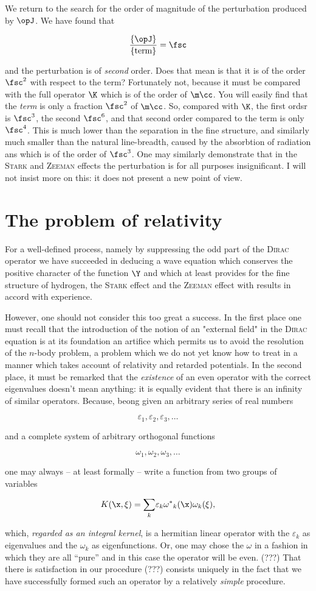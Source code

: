 \documentclass{article}
\newcommand{\uequ}[1]{
\begin{equation*}
#1
\end{equation*}
}
\newcommand{\var}[1]{#1}
\newcommand{\CC}[1]{{#1^{*}}}
\renewcommand{\it}[1]{\textit{#1}}
\renewcommand{\sc}[1]{\textsc{#1}}
\newcommand{\sumk}{\underset{k}{\sum}}
\begin{document}
We return to the search for the order of magnitude of the perturbation produced by $\opJ$. We have found that
\uequ{
\frac{\{\opJ\}}{\{\text{term}\}} = \fsc
}
and the perturbation is of \it{second} order. Does that mean is that it is of the order $\fsc^2$ with respect to the term? Fortunately not, because it must be compared with the full operator $\K$ which is of the order of $\m\cc$. You will easily find that the \it{term} is only a fraction $\fsc^2$ of $\m\cc$. So, compared with $\K$, the first ordsr is $\fsc^3$, the second $\fsc^6$, and that second order compared to the term is only $\fsc^4$. This is much lower than the separation in the fine structure, and similarly much smaller than the natural line-breadth, caused by the absorbtion of radiation ans which is of the order of $\fsc^3$.
One may similarly demonstrate that in the \sc{Stark} and \sc{Zeeman} effects the perturbation is for all purposes insignificant. I will not insist more on this: it does not present a new point of view.

\section{The problem of relativity}

For a well-defined process, namely by suppressing the odd part of the \sc{Dirac} operator we have succeeded in deducing a wave equation which conserves the positive character of the function $\Y$ and which at least provides for the fine structure of hydrogen, the \sc{Stark} effect and the \sc{Zeeman} effect with results in accord with experience.

However, one should not consider this too great a success. In the first place one must recall that the introduction of the notion of an "external field" in the \sc{Dirac} equation is at its foundation an artifice which permits us to avoid the resolution of the $n$-body problem, a problem which we do not yet know how to treat in a manner which takes account of relativity and retarded potentials. In the second place, it must be remarked that the \it{existence} of an even operator with the correct eigenvalues doesn't mean anything: it is equally evident that there is an infinity of similar operators. Because, beong given an arbitrary series of real numbers
\uequ{
\varepsilon_1, \varepsilon_2, \varepsilon_3, \dots
}
and a complete system of arbitrary orthogonal functions
\uequ{
\omega_1, \omega_2, \omega_3, \dots
}
one may always -- at least formally -- write a function from two groups of variables
\uequ{
\var{K}(\x, \var{\xi}) = \sumk\varepsilon_k\CC{\omega}_k(\x)\omega_k(\var{\xi}),
}
which, \it{regarded as an integral kernel}, is a hermitian linear operator with the $\varepsilon_k$ as eigenvalues and the $\omega_k$ as eigenfunctions. Or, one may chose the $\omega$ in a fashion in which they are all “pure” and in this case the operator will be even. (???) That there is satisfaction in our procedure (???) consists uniquely in the fact that we have successfully formed such an operator by a relatively \it{simple} procedure.
\end{document}
